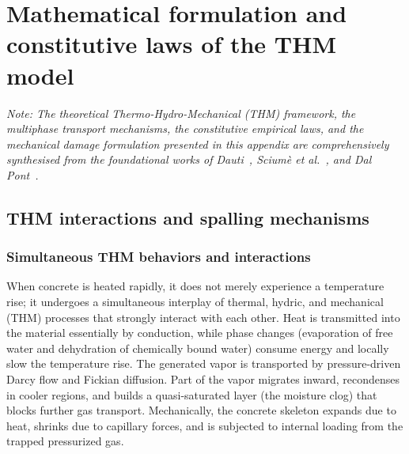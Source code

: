 \chapter{Mathematical formulation and constitutive laws of the THM model} \label{appendixA}
\textit{Note: The theoretical Thermo-Hydro-Mechanical (THM) framework, the multiphase transport mechanisms, the constitutive empirical laws, and the mechanical damage formulation presented in this appendix are comprehensively synthesised from the foundational works of Dauti~\cite{dauti2018}, Sciumè et al.~\cite{sciume2024}, and Dal Pont~\cite{dalpont2020}.}

\section{THM interactions and spalling mechanisms} \label{sec:THM_spalling_app}

\subsection{Simultaneous THM behaviors and interactions}
When concrete is heated rapidly, it does not merely experience a temperature rise; it undergoes a simultaneous interplay of thermal, hydric, and mechanical (THM) processes that strongly interact with each other. Heat is transmitted into the material essentially by conduction, while phase changes (evaporation of free water and dehydration of chemically bound water) consume energy and locally slow the temperature rise. The generated vapor is transported by pressure-driven Darcy flow and Fickian diffusion. Part of the vapor migrates inward, recondenses in cooler regions, and builds a quasi-saturated layer (the moisture clog) that blocks further gas transport. Mechanically, the concrete skeleton expands due to heat, shrinks due to capillary forces, and is subjected to internal loading from the trapped pressurized gas.

